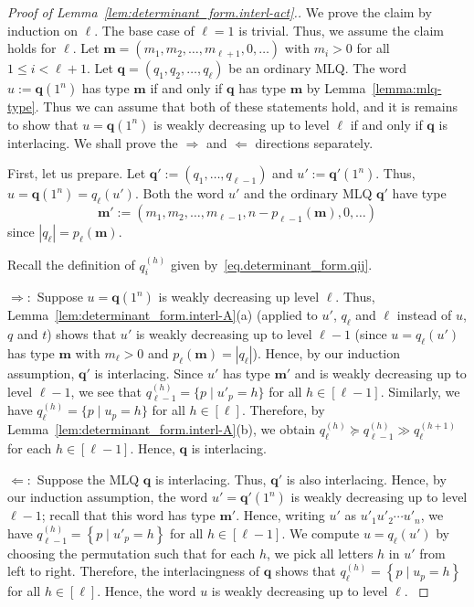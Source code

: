 \documentclass[reqno]{amsart}
\newcommand{\0}{\phantom{c}}
\newcommand{\mm}{\mathbf{m}}
\newcommand{\qq}{\mathbf{q}}
\newenvironment{verlong}{}{}
\newenvironment{vershort}{}{}
\newcommand{\set}[1]{\left\{ #1 \right\}}
\newcommand{\abs}[1]{\left| #1 \right|}
\newcommand{\tup}[1]{\left( #1 \right)}
\newcommand{\ive}[1]{\left[ #1 \right]}
\theoremstyle{plain}
\theoremstyle{definition}
\numberwithin{equation}{section}
\begin{document}
\begin{proof}[Proof of Lemma~\ref{lem:determinant_form.interl-act}.]
We prove the claim by induction on $\ell$.
The base case of $\ell = 1$ is trivial.
Thus, we assume the claim holds for $\ell$.
Let $\mm = \tup{m_1, m_2, \ldots, m_{\ell+1}, 0, \ldots}$ with $m_i > 0$ for all $1 \leq i < \ell + 1$.
Let $\qq = \tup{q_1, q_2, \dotsc, q_{\ell}}$ be an ordinary MLQ.
The word $u := \qq(1^n)$ has type $\mm$ if and only if $\qq$ has type $\mm$ by Lemma~\ref{lemma:mlq-type}.
Thus we can assume that both of these statements hold,
and it is remains to show that $u = \qq(1^n)$ is weakly decreasing up to level $\ell$ if and only if $\qq$ is interlacing.
We shall prove the $\Longrightarrow$ and $\Longleftarrow$ directions separately.

First, let us prepare.
Let $\qq' := \tup{q_1, \dotsc, q_{\ell-1}}$ and $u' := \qq'(1^n)$.
Thus, $u = \qq(1^n) = q_{\ell} (u')$.
Both the word $u'$ and the ordinary MLQ $\qq'$ have type
\[
\mm' := (m_1, m_2, \dotsc, m_{\ell-1}, n - p_{\ell-1}(\mm), 0, \ldots)
\]
since $\abs{q_{\ell}} = p_{\ell}(\mm)$.

Recall the definition of $q_i^{(h)}$ given by~\eqref{eq.determinant_form.qij}.

$\Longrightarrow:$
Suppose $u = \qq(1^n)$ is weakly decreasing up level $\ell$.
Thus, Lemma~\ref{lem:determinant_form.interl-A}(a) (applied to $u'$, $q_\ell$ and $\ell$ instead of $u$, $q$ and $t$) shows that $u'$ is weakly decreasing up to level $\ell-1$
(since $u = q_{\ell}(u')$ has type $\mm$ with $m_{\ell} > 0$
and $p_{\ell}(\mm) = \abs{q_{\ell}}$).
Hence, by our induction assumption, $\qq'$ is interlacing.
Since $u'$ has type $\mm'$ and is weakly decreasing up to level $\ell-1$, we see that $q_{\ell-1}^{(h)} = \{p \mid u'_p = h\}$ for all $h \in \ive{\ell-1}$.
Similarly, we have $q_\ell^{(h)} = \{p \mid u_p = h\}$ for all $h \in \ive{\ell}$.
Therefore, by Lemma~\ref{lem:determinant_form.interl-A}(b), we obtain $q_\ell^{(h)} \succeq q_{\ell-1}^{(h)} \gg q_\ell^{(h+1)}$ for each $h \in \ive{\ell-1}$.
Hence, $\qq$ is interlacing.

$\Longleftarrow:$
Suppose the MLQ $\qq$ is interlacing.
Thus, $\qq'$ is also interlacing.
Hence, by our induction assumption, the word $u' = \qq'(1^n)$ is weakly decreasing up to level $\ell - 1$;
recall that this word has type $\mm'$.
Hence, writing $u'$ as $u'_1 u'_2 \cdots u'_n$, we have
$q_{\ell-1}^{(h)} = \set{p \mid u'_p = h}$ for all $h \in \ive{\ell-1}$.
\begin{vershort}
We compute $u = q_{\ell}(u')$ by choosing the permutation such that for each $h$, we pick all letters $h$ in $u'$ from left to right.
Therefore, the interlacingness of $\qq$ shows that $q_{\ell}^{(h)} = \set{p \mid u_p = h}$ for all $h \in \ive{\ell}$.
Hence, the word $u$ is weakly decreasing up to level $\ell$.
\end{vershort}
\begin{verlong}


\end{verlong}
\end{proof}
\end{document}

